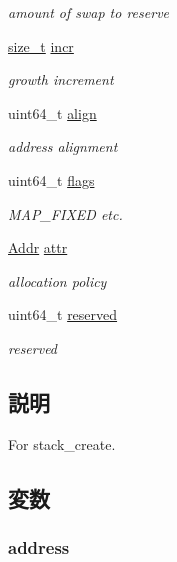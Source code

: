 \begin{DoxyCompactItemize}
\begin{DoxyCompactList}\small\item\em amount of swap to reserve \item\end{DoxyCompactList}\item 
\hyperlink{classTru64_a186ea1339bffb378854987065835afe3}{size\_\-t} \hyperlink{structTru64_1_1vm__stack_ae691c9312749cf655eb0457c50344979}{incr}
\begin{DoxyCompactList}\small\item\em growth increment \item\end{DoxyCompactList}\item 
uint64\_\-t \hyperlink{structTru64_1_1vm__stack_ae762be4c1d1b1bf587592e9225d96d5c}{align}
\begin{DoxyCompactList}\small\item\em address alignment \item\end{DoxyCompactList}\item 
uint64\_\-t \hyperlink{structTru64_1_1vm__stack_a899a76dc5f03f0d4ea3793c339e07ee9}{flags}
\begin{DoxyCompactList}\small\item\em MAP\_\-FIXED etc. \item\end{DoxyCompactList}\item 
\hyperlink{base_2types_8hh_af1bb03d6a4ee096394a6749f0a169232}{Addr} \hyperlink{structTru64_1_1vm__stack_a4fd2848e51f4914089a66fb22de5c35d}{attr}
\begin{DoxyCompactList}\small\item\em allocation policy \item\end{DoxyCompactList}\item 
uint64\_\-t \hyperlink{structTru64_1_1vm__stack_ac35c1fbebe2017fc1ca10f5803668dfd}{reserved}
\begin{DoxyCompactList}\small\item\em reserved \item\end{DoxyCompactList}\end{DoxyCompactItemize}


\subsection{説明}
For stack\_\-create. 

\subsection{変数}
\hypertarget{structTru64_1_1vm__stack_ab9fefac780347b9571641226e9db77c1}{
\subsubsection[{address}]{ {\bf address}}}
\label{structTru64_1_1vm__stack_ab9fefac780347b9571641226e9db77c1}


